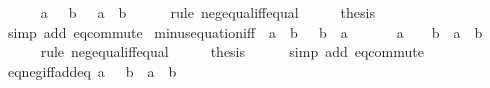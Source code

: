 \begin{isabellebody}
\ \ \isamarkupfalse%
\ {\isachardoublequoteopen}{\isacharminus}{\kern0pt}\ {\isacharparenleft}{\kern0pt}{\isacharminus}{\kern0pt}\ a{\isacharparenright}{\kern0pt}\ {\isacharequal}{\kern0pt}\ {\isacharminus}{\kern0pt}\ b\ {\isasymlongleftrightarrow}\ {\isacharminus}{\kern0pt}\ a\ {\isacharequal}{\kern0pt}\ b{\isachardoublequoteclose}\isanewline
\ \ \ \ \isamarkupfalse%
\ {\isacharparenleft}{\kern0pt}rule\ neg{\isacharunderscore}{\kern0pt}equal{\isacharunderscore}{\kern0pt}iff{\isacharunderscore}{\kern0pt}equal{\isacharparenright}{\kern0pt}\isanewline
\ \ \isamarkupfalse%
\ \isamarkupfalse%
\ {\isacharquery}{\kern0pt}thesis\isanewline
\ \ \ \ \isamarkupfalse%
\ {\isacharparenleft}{\kern0pt}simp\ add{\isacharcolon}{\kern0pt}\ eq{\isacharunderscore}{\kern0pt}commute{\isacharparenright}{\kern0pt}\isanewline
{}\isamarkupfalse%
%
\endisatagproof
{\isafoldproof}%
%
\isadelimproof
\isanewline
%
\endisadelimproof
\isanewline
{}\isamarkupfalse%
\ minus{\isacharunderscore}{\kern0pt}equation{\isacharunderscore}{\kern0pt}iff{\isacharcolon}{\kern0pt}\ {\isachardoublequoteopen}{\isacharminus}{\kern0pt}\ a\ {\isacharequal}{\kern0pt}\ b\ {\isasymlongleftrightarrow}\ {\isacharminus}{\kern0pt}\ b\ {\isacharequal}{\kern0pt}\ a{\isachardoublequoteclose}\isanewline
%
\isadelimproof
%
\endisadelimproof
%
\isatagproof
{}\isamarkupfalse%
\ {\isacharminus}{\kern0pt}\isanewline
\ \ \isamarkupfalse%
\ {\isachardoublequoteopen}{\isacharminus}{\kern0pt}\ a\ {\isacharequal}{\kern0pt}\ {\isacharminus}{\kern0pt}\ {\isacharparenleft}{\kern0pt}{\isacharminus}{\kern0pt}\ b{\isacharparenright}{\kern0pt}\ {\isasymlongleftrightarrow}\ a\ {\isacharequal}{\kern0pt}\ {\isacharminus}{\kern0pt}b{\isachardoublequoteclose}\isanewline
\ \ \ \ \isamarkupfalse%
\ {\isacharparenleft}{\kern0pt}rule\ neg{\isacharunderscore}{\kern0pt}equal{\isacharunderscore}{\kern0pt}iff{\isacharunderscore}{\kern0pt}equal{\isacharparenright}{\kern0pt}\isanewline
\ \ \isamarkupfalse%
\ \isamarkupfalse%
\ {\isacharquery}{\kern0pt}thesis\isanewline
\ \ \ \ \isamarkupfalse%
\ {\isacharparenleft}{\kern0pt}simp\ add{\isacharcolon}{\kern0pt}\ eq{\isacharunderscore}{\kern0pt}commute{\isacharparenright}{\kern0pt}\isanewline
{}\isamarkupfalse%
%
\endisatagproof
{\isafoldproof}%
%
\isadelimproof
\isanewline
%
\endisadelimproof
\isanewline
{}\isamarkupfalse%
\ eq{\isacharunderscore}{\kern0pt}neg{\isacharunderscore}{\kern0pt}iff{\isacharunderscore}{\kern0pt}add{\isacharunderscore}{\kern0pt}eq{\isacharunderscore}{\kern0pt}{}{\isacharcolon}{\kern0pt}\ {\isachardoublequoteopen}a\ {\isacharequal}{\kern0pt}\ {\isacharminus}{\kern0pt}\ b\ {\isasymlongleftrightarrow}\ a\ {\isacharplus}{\kern0pt}\ b\ {\isacharequal}{\kern0pt}\ {}{\isachardoublequoteclose}\isanewline

\end{isabellebody}
